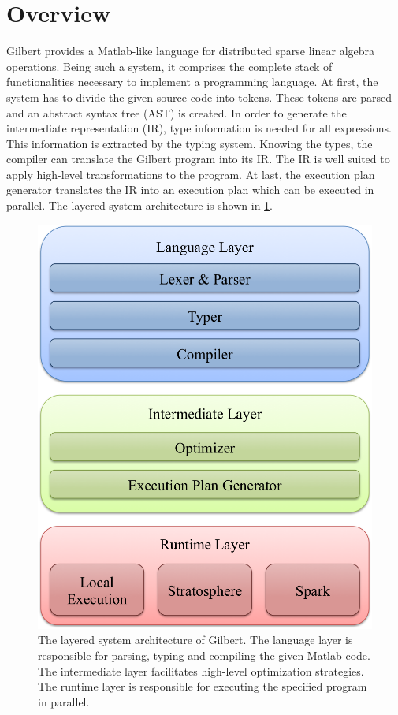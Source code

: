 \section{Overview}
\label{sec:overview}

Gilbert provides a Matlab-like language for distributed sparse linear algebra operations.
Being such a system, it comprises the complete stack of functionalities necessary to implement a programming language.
At first, the system has to divide the given source code into tokens.
These tokens are parsed and an abstract syntax tree (AST) is created.
In order to generate the intermediate representation (IR), type information is needed for all expressions.
This information is extracted by the typing system.
Knowing the types, the compiler can translate the Gilbert program into its IR.
The IR is well suited to apply high-level transformations to the program.
At last, the execution plan generator translates the IR into an execution plan which can be executed in parallel.
The layered system architecture is shown in \cref{fig:systemArchitecture}.

\begin{figure}
	\centering
	\includegraphics[height=0.175\paperheight]{images/systemArchitecture.png}
	\caption{The layered system architecture of Gilbert. The language layer is responsible for parsing, typing and compiling the given Matlab code. The intermediate layer facilitates high-level optimization strategies. The runtime layer is responsible for executing the specified program in parallel.}
	\label{fig:systemArchitecture}
\end{figure}

